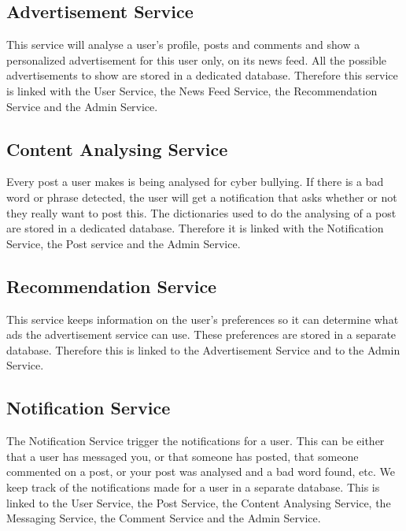 \documentclass[a4paper,12pt]{article}
\begin{document}
\subsection{Advertisement Service}

This service will analyse a user's profile, posts and comments and show a personalized advertisement for this user only, on its news feed. All the possible advertisements to show are stored in a dedicated database.
\newline
\newline
Therefore this service is linked with the User Service, the News Feed Service, the Recommendation Service and the Admin Service.

\subsection{Content Analysing Service}

Every post a user makes is being analysed for cyber bullying. If there is a bad word or phrase detected, the user will get a notification that asks whether or not they really want to post this. The dictionaries used to do the analysing of a post are stored in a dedicated database.
\newline
\newline
Therefore it is linked with the Notification Service, the Post service and the Admin Service.

\subsection{Recommendation Service}

This service keeps information on the user's preferences so it can determine what ads the advertisement service can use. These preferences are stored in a separate database. Therefore this is linked to the Advertisement Service and to the Admin Service.

\subsection{Notification Service}

The Notification Service trigger the notifications for a user. This can be either that a user has messaged you, or that someone has posted, that someone commented on a post, or your post was analysed and a bad word found, etc. We keep track of the notifications made for a user in a separate database.
\newline
\newline
This is linked to the User Service, the Post Service, the Content Analysing Service, the Messaging Service, the Comment Service and the Admin Service.
\end{document}
